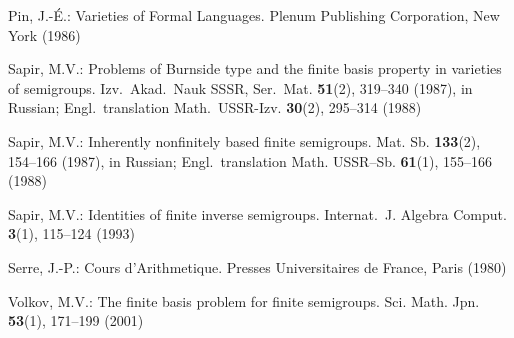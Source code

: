 \documentclass[11pt,reqno]{amsart}
\begin{document}
\begin{thebibliography}{99}
Pin, J.-\'E.: Varieties of Formal Languages. Plenum Publishing Corporation, New York (1986)

Sapir, M.V.: Problems of Burnside type and the finite basis property in varieties of semigroups. Izv.\ Akad.\ Nauk SSSR, Ser.\ Mat.
\textbf{51}(2), 319--340 (1987), in Russian; Engl.\ translation Math.\ USSR-Izv. \textbf{30}(2), 295--314 (1988)

Sapir, M.V.: Inherently nonfinitely based finite semigroups. Mat. Sb. \textbf{133}(2), 154--166 (1987), in Russian; Engl.\ translation
Math. USSR--Sb. \textbf{61}(1), 155--166 (1988)

Sapir, M.V.: Identities of finite inverse semigroups. Internat.\ J. Algebra Comput. \textbf{3}(1), 115--124 (1993)

Serre, J.-P.: Cours d'Arithmetique. Presses Universitaires de France, Paris (1980)

Volkov, M.V.: The finite basis problem for finite semigroups. Sci. Math. Jpn. \textbf{53}(1), 171--199 (2001)
\end{thebibliography}
\end{document}

